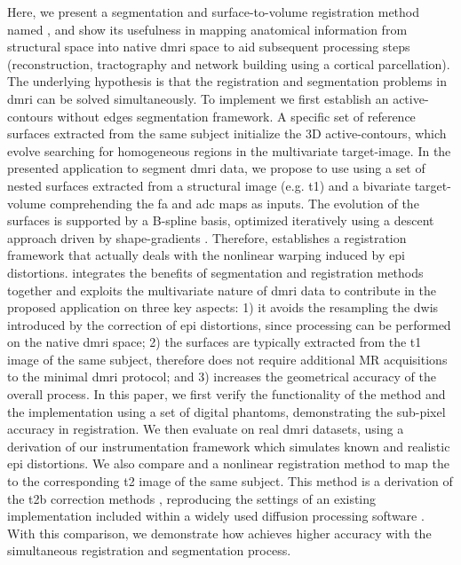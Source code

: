 Here, we present a segmentation and surface-to-volume registration method
  named \regseg{}, and show its usefulness in mapping anatomical information from structural
  space into native \gls*{dmri} space to aid subsequent processing steps
  (reconstruction, tractography and network building using a cortical parcellation).
The underlying hypothesis is that the registration and segmentation problems
  in \gls*{dmri} can be solved simultaneously.
To implement \regseg{} we first establish an active-contours without edges
  \citep{chan_active_2001} segmentation framework.
A specific set of reference surfaces extracted from the same subject initialize
  the 3D active-contours, which evolve searching for homogeneous regions in the multivariate
  target-image.
In the presented application to segment \gls*{dmri} data, we propose to use \regseg{}
  using a set of nested surfaces extracted from a structural image (e.g. \gls*{t1}) and
  a bivariate target-volume comprehending the \gls*{fa} and \gls*{adc} maps as inputs.
The evolution of the surfaces is supported by a B-spline basis, optimized
  iteratively using a descent approach driven by shape-gradients
  \citep{besson_dream2s_2003,herbulot_segmentation_2006}.
Therefore, \regseg{} establishes a registration framework that actually
  deals with the nonlinear warping induced by \gls*{epi} distortions.
\Regseg{} integrates the benefits of segmentation and registration methods together and
  exploits the multivariate nature of \gls*{dmri} data to contribute in the proposed
  application on three key aspects:
  1) it avoids the resampling the \glspl*{dwi} introduced by the correction of \gls*{epi}
    distortions, since processing can be performed on the native \gls*{dmri} space;
  2) the surfaces are typically extracted from the \gls*{t1} image of the same subject,
    therefore \regseg{} does not require additional MR acquisitions to the minimal
    \gls*{dmri} protocol; and
  3) \regseg{} increases the geometrical accuracy of the overall process.
In this paper, we first verify the functionality of the method and the \regseg{}
  implementation using a set of digital phantoms, demonstrating the sub-pixel accuracy
  in registration.
We then evaluate \regseg{} on real \gls*{dmri} datasets, using a derivation of our
  instrumentation framework \citep{esteban_simulationbased_2014} which simulates
  known and realistic \gls*{epi} distortions.
We also compare \regseg{} and a nonlinear registration method to map the \lowb{} to
  the corresponding \gls*{t2} image of the same subject.
This method is a derivation of the \gls*{t2b} correction methods \citep{kybic_unwarping_2000},
  reproducing the settings of an existing implementation included within a widely used diffusion
  processing software \citep[\emph{ExploreDTI},][]{leemans_exploredti_2009}.
With this comparison, we demonstrate how \regseg{} achieves higher accuracy with the
  simultaneous registration and segmentation process.